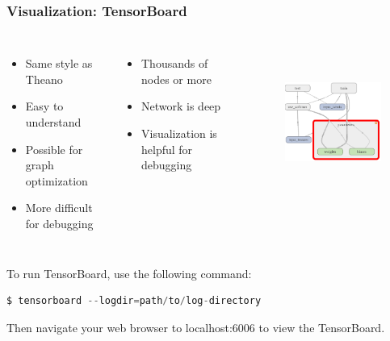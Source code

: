 \begin{frame}[fragile]
  \MyLogo
  \frametitle{Visualization: TensorBoard}  

\vskip -25pt
\begin{columns}
\scriptsize{
\begin{itemize}
\item  Same style as Theano
\item  Easy to understand
\item  Possible for graph optimization
\item  \alert{More difficult for debugging}
\end{itemize}

\medskip

\begin{itemize}
\item  Thousands of nodes or more 
\item  Network is deep
\item  Visualization is helpful for debugging 
\end{itemize}
}
%
\begin{figure}[htbp] 
   \includegraphics[height=2in]{figures/graphvisualization.png} 
\end{figure}
\end{columns}

\pause 

To run TensorBoard, use the following command: 
\begin{lstlisting}[language=c,numbers=none] 
$ tensorboard --logdir=path/to/log-directory
\end{lstlisting}
Then navigate your web browser to \alert{localhost:6006} to view the TensorBoard.

\end{frame}

%

